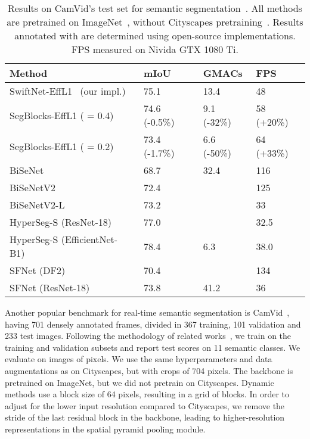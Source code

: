 \begin{table}[t]
\scriptsize
\centering
\caption{{Results on CamVid's test set for semantic segmentation~\cite{brostow2009semantic_camvid}. All methods are pretrained on ImageNet~\cite{deng_imagenet_2009}, without Cityscapes pretraining~\cite{cordts_cityscapes_2016}. Results annotated with   are determined using open-source implementations. FPS measured on Nivida GTX 1080 Ti.  }}\label{tab:results_camvid}
\begin{tabular}{@{}llll@{}}
\toprule
\textbf{Method}              & \textbf{mIoU} & \textbf{GMACs} & \textbf{FPS}                    \\  \midrule
SwiftNet-EffL1~\cite{orsic_defense_2019} (our impl.)    & 75.1          & 13.4           & 48                  \\
SegBlocks-EffL1 ( = 0.4)& 74.6  (-0.5\%)& 9.1 (-32\%) & 58  (+20\%) \\
SegBlocks-EffL1 ( = 0.2)& 73.4  (-1.7\%)& 6.6 (-50\%) & 64  (+33\%) \\
\midrule

BiSeNet~\cite{ferrari_bisenet_2018}                     & 68.7          &  32.4          & 116                  \\
BiSeNetV2~\cite{yu2021bisenet}                    & 72.4          &                & 125                       \\
BiSeNetV2-L~\cite{yu2021bisenet}                  & 73.2          &                & 33                        \\
HyperSeg-S (ResNet-18)~\cite{nirkin2021hyperseg}   & 77.0          &                & 32.5          \\
HyperSeg-S (EfficientNet-B1)~\cite{nirkin2021hyperseg}   & 78.4        &  6.3       & 38.0            \\
SFNet (DF2)~\cite{li2020semantic}                  & 70.4          &                & 134                      \\
SFNet (ResNet-18)~\cite{li2020semantic}            & 73.8          &   41.2         & 36                      \\                 \bottomrule
\end{tabular}
\end{table}

Another popular benchmark for real-time semantic segmentation is CamVid~\cite{brostow2009semantic_camvid}, having 701 densely annotated frames, divided in 367 training, 101 validation and 233 test images. Following the methodology of related works~\cite{ferrari_bisenet_2018, orsic_defense_2019, yu2021bisenet}, we train on the training and validation subsets and report test scores on 11 semantic classes. We evaluate on images of  pixels. We use the same hyperparameters and data augmentations as on Cityscapes, but with crops of 704 pixels. The backbone is pretrained on ImageNet, but we did not pretrain on Cityscapes.
Dynamic methods use a block size of 64 pixels, resulting in a grid of  blocks. In order to adjust for the lower input resolution compared to Cityscapes, we remove the stride of the last residual block in the backbone, leading to higher-resolution representations in the spatial pyramid pooling module.

